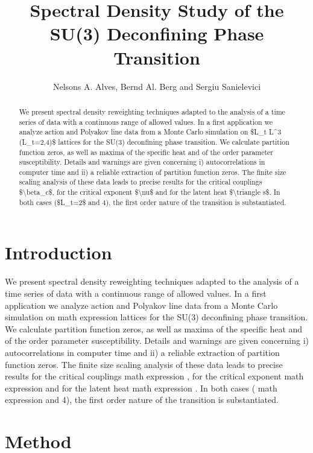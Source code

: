 \documentclass[11pt]{article}
\title{Spectral Density Study of the SU(3) Deconfining Phase Transition}
\author{Nelsons A. Alves, Bernd Al. Berg and Sergiu Sanielevici}
\date{}
\begin{document}
\maketitle
\begin{abstract}

We present spectral density reweighting techniques adapted to the analysis of a time series of data with a continuous range of allowed values. In a first application we analyze action and Polyakov line data from a Monte Carlo simulation on \$L\_t L\textasciicircum{}3 (L\_t=2,4)\$ lattices for the SU(3) deconfining phase transition. We calculate partition function zeros, as well as maxima of the specific heat and of the order parameter susceptibility. Details and warnings are given concerning i) autocorrelations in computer time and ii) a reliable extraction of partition function zeros. The finite size scaling analysis of these data leads to precise results for the critical couplings \$\textbackslash{}beta\_c\$, for the critical exponent \$\textbackslash{}nu\$ and for the latent heat \$\textbackslash{}triangle s\$. In both cases (\$L\_t=2\$ and 4), the first order nature of the transition is substantiated.

\end{abstract}

\section{Introduction}

We present spectral density reweighting techniques adapted to the analysis of a time series of data with a continuous range of allowed values. In a first application we analyze action and Polyakov line data from a Monte Carlo simulation on math expression lattices for the SU(3) deconfining phase transition. We calculate partition function zeros, as well as maxima of the specific heat and of the order parameter susceptibility. Details and warnings are given concerning i) autocorrelations in computer time and ii) a reliable extraction of partition function zeros. The finite size scaling analysis of these data leads to precise results for the critical couplings math expression , for the critical exponent math expression and for the latent heat math expression . In both cases ( math expression and 4), the first order nature of the transition is substantiated.

\section{Method}
\end{document}
